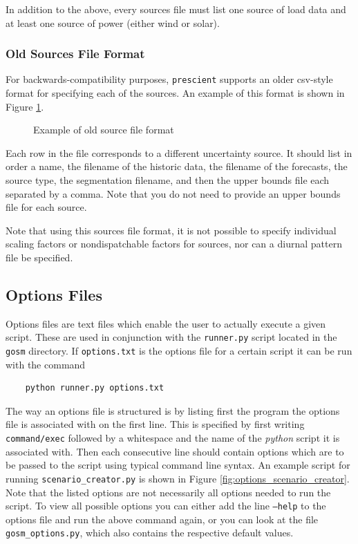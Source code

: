 \documentclass[11pt]{article}
\begin{document}
In addition to the above, every sources file must list one source of load data and at least one source of power (either wind or solar).

\subsubsection{Old Sources File Format}

For backwards-compatibility purposes, \texttt{prescient} supports an older csv-style format for
specifying each of the sources. An example of this format is shown in Figure \ref{sourcelist}.

\begin{figure}[H]
	\begin{framed}
		
	\end{framed}
	\caption{Example of old source file format}
	\label{sourcelist}
\end{figure}

Each row in the file corresponds to a different uncertainty source. It should list in order a name, the filename of the historic data, the filename of the forecasts, the source type, the segmentation filename, and then the upper bounds file each separated by a comma. Note that you do not need to provide an upper bounds file for each source.

Note that using this sources file format, it is not possible to specify individual scaling factors or nondispatchable factors for sources, nor can a diurnal pattern file be specified.

\subsection{Options Files}\label{sec:options_file}
Options files are text files which enable the user to actually execute a given script. These are used in conjunction with the \texttt{runner.py} script located in the \texttt{gosm} directory.
If \texttt{options.txt} is the options file for a certain script it can be run with the command
\begin{center}
	\begin{verbatim}
	python runner.py options.txt
	\end{verbatim}
\end{center}

The way an options file is structured is by listing first the program the options file is associated with on the first line. This is specified by first writing \texttt{command/exec} followed by a whitespace and the name of the \textit{python} script it is associated with. Then each consecutive line should contain options which are to be passed to the script using typical command line syntax. An example script for running \texttt{scenario\_creator.py} is shown in Figure \ref{fig:options_scenario_creator}. Note that the listed options are not necessarily all options needed to run the script.
To view all possible options you can either add the line \texttt{--help} to the options file and run the above command again, or you can look at the file \texttt{gosm\_options.py}, which also contains the respective default values.
\end{document}
